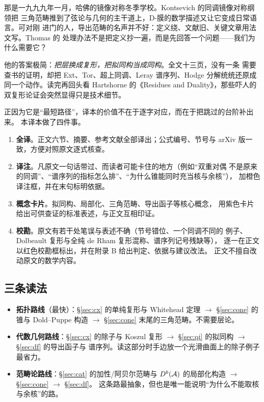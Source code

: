 那是一九九九年一月，哈佛的镜像对称冬季学校。Kontsevich 的同调镜像对称纲领把
三角范畴推到了弦论与几何的主干道上，D-膜的数学描述又让它变成日常语言。可对刚
进门的人，导出范畴的名声并不好：定义绕、文献旧、关键文章用法文写。Thomas 的
处理办法不是把定义抄一遍，而是先回答一个问题——我们为什么需要它？

他的答案极简：\emph{把层换成复形，把拟同构当成同构}。全文十三页，没有一条
需要查书的证明，却把 Ext、Tor、超上同调、Leray 谱序列、Hodge 分解统统还原成
同一个动作。读完再回头看 Hartshorne 的《Residues and Duality》，那些吓人的
双复形论证会突然显得只是技术细节。

正因为它是“最短路径”，译本的价值不在于逐字对应，而在于把跳过的台阶补出来。
本译本做了四件事。

\begin{enumerate}[leftmargin=1.6em,itemsep=0.2em]
\item \textbf{全译}。正文六节、摘要、参考文献全部译出；公式编号、节号与
      arXiv 版一致，方便对照原文逐式核查。
\item \textbf{译注}。凡原文一句话带过、而读者可能卡住的地方（例如“双重对偶
      不是原来的同调”、“谱序列的指标怎么排”、“为什么锥能同时充当核与余核”），
      加橙色译注框，并在末句标明依据。
\item \textbf{概念卡片}。拟同构、局部化、三角范畴、导出函子等核心概念，
      用紫色卡片给出可供查证的标准表述，与正文互相印证。
\item \textbf{校勘}。原文有若干处笔误与表述不确（节号错位、一个同调不同的
      例子、Dolbeault 复形与全纯 de Rham 复形混称、谱序列记号残缺等），
      逐一在正文以红色校勘框标出，并在附录 B 给出判定、依据与建议改法。
      正文不擅自改动原文的数学内容。
\end{enumerate}

\subsection*{三条读法}

\begin{itemize}[leftmargin=1.6em,itemsep=0.2em]
\item \textbf{拓扑路线}（最快）：§\ref{sec:cx} 的单纯复形与 Whitehead 定理
      $\to$ §\ref{sec:cone} 的锥与 Dold--Puppe 构造 $\to$ §\ref{sec:cone}
      末尾的三角范畴。不需要层论。
\item \textbf{代数几何路线}：§\ref{sec:cx} 的除子与 Koszul 复形
      $\to$ §\ref{sec:qi} 的拟同构 $\to$ §\ref{sec:df} 的导出函子与
      谱序列。读这部分时手边放一个光滑曲面上的除子例子最省力。
\item \textbf{范畴论路线}：§\ref{sec:cat} 的加性/阿贝尔范畴与 $D^b(\mathcal{A})$
      的局部化构造 $\to$ §\ref{sec:cone} $\to$ §\ref{sec:df}。
      这条路最抽象，但也是唯一能说明“为什么不能取核与余核”的路。
\end{itemize}

